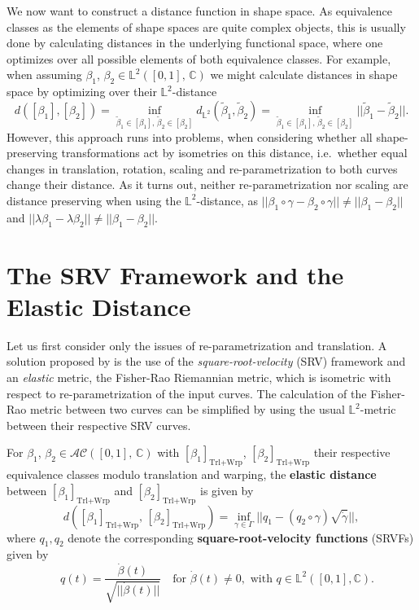 \noindent We now want to construct a distance function in shape space.
As equivalence classes as the elements of shape spaces are quite complex objects, this is usually done by calculating distances in the underlying functional space, where one optimizes over all possible elements of both equivalence classes.
For example, when assuming $\beta_1$, $\beta_2 \in \mathbb{L}^2([0,1],\, \mathbb{C})$ we might calculate distances in shape space by optimizing over their $\mathbb{L}^2$-distance
$$d([\beta_1], [\beta_2]) = \inf_{\tilde \beta_1 \in [\beta_1],\,\tilde \beta_2 \in [\beta_2]} d_{\mathbb{L}^2}(\tilde \beta_1, \tilde \beta_2) = \inf_{\tilde\beta_1 \in [\beta_1],\, \tilde\beta_2 \in [\beta_2]} || \tilde\beta_1 - \tilde\beta_2 ||.$$
However, this approach runs into problems, when considering whether all shape-preserving transformations act by isometries on this distance, i.e.\ whether equal changes in translation, rotation, scaling and re-parametrization to both curves change their distance. 
As it turns out, neither re-parametrization nor scaling are distance preserving when using the $\mathbb{L}^2$-distance, as $||\beta_1 \circ \gamma - \beta_2 \circ \gamma|| \neq ||\beta_1 - \beta_2||$ and $||\lambda \beta_1 - \lambda \beta_2|| \neq ||\beta_1 - \beta_2||$.



\section{The SRV Framework and the Elastic Distance}
\label{theo:srv}
Let us first consider only the issues of re-parametrization and translation.
A solution proposed by \cite{SrivastavaEtAl2011} is the use of the \textit{square-root-velocity} (SRV) framework and an \textit{elastic} metric, the Fisher-Rao Riemannian metric, which is isometric with respect to re-parametrization of the input curves.
The calculation of the Fisher-Rao metric between two curves can be simplified by using the usual $\mathbb{L}^2$-metric between their respective SRV curves.

\begin{definition}
  For $\beta_1$, $\beta_2 \in \mathcal{AC}([0,1],\,\mathbb{C})$ with $[\beta_1]_{\text{Trl+Wrp}}$, $[\beta_2]_{\text{Trl+Wrp}}$ their respective equivalence classes modulo translation and warping, the \textbf{elastic distance} between $[\beta_1]_{\text{Trl+Wrp}}$ and $[\beta_2]_{\text{Trl+Wrp}}$ is given by
  $$d([\beta_1]_{\text{Trl+Wrp}},\, [\beta_2]_{\text{Trl+Wrp}}) = \inf_{\gamma \in \Gamma} || q_1 - (q_2 \circ \gamma) \sqrt{\dot\gamma} ||,$$
  where $q_1, q_2$ denote the corresponding \textbf{square-root-velocity functions} (SRVFs) given by
$$ \quad q(t) = \frac{\dot{\beta}(t)}{\sqrt{|| \dot{\beta}(t) ||}} \quad \text{for} \,\, \dot{\beta}(t) \neq 0, \,\, \text{with} \,\, q \in \mathbb{L}^2([0,1], \mathbb{C}). $$
\end{definition}

